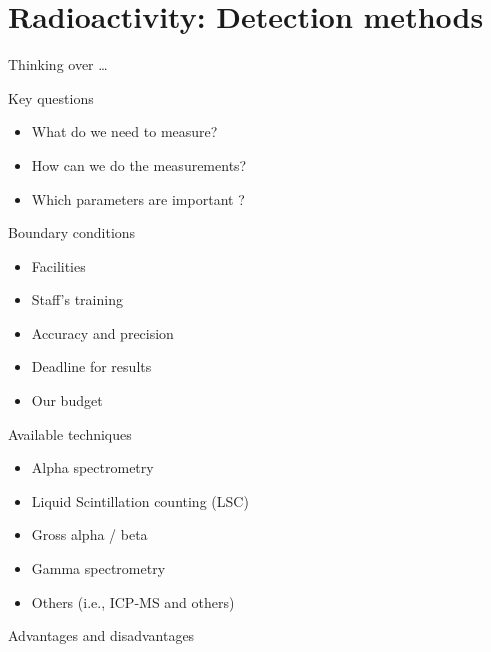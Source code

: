 \section{Radioactivity: Detection methods}


\begin{frame}{Thinking over \ldots}

\begin{exampleblock}{Key questions}

\begin{itemize}
	\item What do we need to measure? 
	\item How can we do the measurements?
	\item Which parameters are important ? 
\end{itemize}

\end{exampleblock}


\pause

\begin{alertblock}{Boundary conditions}

\begin{itemize}
	\item Facilities
 	\item Staff’s training
 	\item Accuracy and precision
 	\item Deadline for results
 	\item Our budget 
\end{itemize}

\end{alertblock}

\end{frame}


\begin{frame}{Available techniques}

\begin{itemize}
	\item Alpha spectrometry
 	\item Liquid Scintillation counting (LSC)
 	\item Gross alpha / beta
 	\item Gamma spectrometry
 	\item Others (i.e., ICP-MS and others)
\end{itemize}

\centering \arrowdown

\vskip0.5cm \centering \alert{{\large Advantages and disadvantages}}

\end{frame}

